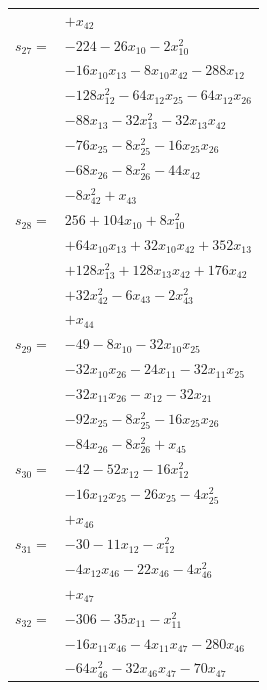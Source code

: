 \begin{longtable}{@{}r@{\;}l@{}}
 & \(\displaystyle +x_{42}\) \\[3pt]
\(s_{27}=\) & \(\displaystyle -224 -26x_{10} -2x_{10}^{2}\) \\
 & \(\displaystyle -16x_{10}x_{13} -8x_{10}x_{42} -288x_{12}\) \\
 & \(\displaystyle -128x_{12}^{2} -64x_{12}x_{25} -64x_{12}x_{26}\) \\
 & \(\displaystyle -88x_{13} -32x_{13}^{2} -32x_{13}x_{42}\) \\
 & \(\displaystyle -76x_{25} -8x_{25}^{2} -16x_{25}x_{26}\) \\
 & \(\displaystyle -68x_{26} -8x_{26}^{2} -44x_{42}\) \\
 & \(\displaystyle -8x_{42}^{2} +x_{43}\) \\[3pt]
\(s_{28}=\) & \(\displaystyle 256 +104x_{10} +8x_{10}^{2}\) \\
 & \(\displaystyle +64x_{10}x_{13} +32x_{10}x_{42} +352x_{13}\) \\
 & \(\displaystyle +128x_{13}^{2} +128x_{13}x_{42} +176x_{42}\) \\
 & \(\displaystyle +32x_{42}^{2} -6x_{43} -2x_{43}^{2}\) \\
 & \(\displaystyle +x_{44}\) \\[3pt]
\(s_{29}=\) & \(\displaystyle -49 -8x_{10} -32x_{10}x_{25}\) \\
 & \(\displaystyle -32x_{10}x_{26} -24x_{11} -32x_{11}x_{25}\) \\
 & \(\displaystyle -32x_{11}x_{26} -x_{12} -32x_{21}\) \\
 & \(\displaystyle -92x_{25} -8x_{25}^{2} -16x_{25}x_{26}\) \\
 & \(\displaystyle -84x_{26} -8x_{26}^{2} +x_{45}\) \\[3pt]
\(s_{30}=\) & \(\displaystyle -42 -52x_{12} -16x_{12}^{2}\) \\
 & \(\displaystyle -16x_{12}x_{25} -26x_{25} -4x_{25}^{2}\) \\
 & \(\displaystyle +x_{46}\) \\[3pt]
\(s_{31}=\) & \(\displaystyle -30 -11x_{12} -x_{12}^{2}\) \\
 & \(\displaystyle -4x_{12}x_{46} -22x_{46} -4x_{46}^{2}\) \\
 & \(\displaystyle +x_{47}\) \\[3pt]
\(s_{32}=\) & \(\displaystyle -306 -35x_{11} -x_{11}^{2}\) \\
 & \(\displaystyle -16x_{11}x_{46} -4x_{11}x_{47} -280x_{46}\) \\
 & \(\displaystyle -64x_{46}^{2} -32x_{46}x_{47} -70x_{47}\) \\

\end{longtable}
